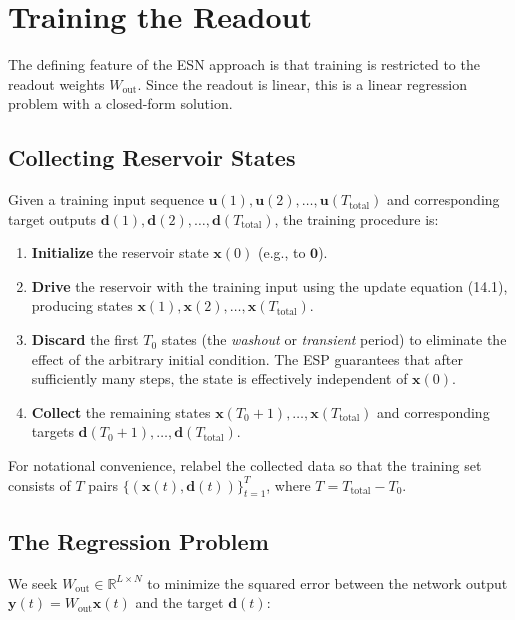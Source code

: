 \section{Training the Readout}\label{sec:14.5}

The defining feature of the ESN approach is that training is restricted to the readout weights $W_{\text{out}}$. Since the readout is linear, this is a linear regression problem with a closed-form solution.

\subsection{Collecting Reservoir States}\label{sec:14.5.1}

Given a training input sequence $\mathbf{u}(1), \mathbf{u}(2), \ldots, \mathbf{u}(T_{\text{total}})$ and corresponding target outputs $\mathbf{d}(1), \mathbf{d}(2), \ldots, \mathbf{d}(T_{\text{total}})$, the training procedure is:

\begin{enumerate}[nosep]
  \item \textbf{Initialize} the reservoir state $\mathbf{x}(0)$ (e.g., to $\mathbf{0}$).
  \item \textbf{Drive} the reservoir with the training input using the update equation (14.1), producing states $\mathbf{x}(1), \mathbf{x}(2), \ldots, \mathbf{x}(T_{\text{total}})$.
  \item \textbf{Discard} the first $T_0$ states (the \textit{washout} or \textit{transient} period) to eliminate the effect of the arbitrary initial condition. The ESP guarantees that after sufficiently many steps, the state is effectively independent of $\mathbf{x}(0)$.
  \item \textbf{Collect} the remaining states $\mathbf{x}(T_0+1), \ldots, \mathbf{x}(T_{\text{total}})$ and corresponding targets $\mathbf{d}(T_0+1), \ldots, \mathbf{d}(T_{\text{total}})$.
\end{enumerate}

For notational convenience, relabel the collected data so that the training set consists of $T$ pairs $\{(\mathbf{x}(t), \mathbf{d}(t))\}_{t=1}^T$, where $T = T_{\text{total}} - T_0$.

\subsection{The Regression Problem}\label{sec:14.5.2}

We seek $W_{\text{out}} \in \mathbb{R}^{L \times N}$ to minimize the squared error between the network output $\mathbf{y}(t) = W_{\text{out}}\mathbf{x}(t)$ and the target $\mathbf{d}(t)$:


